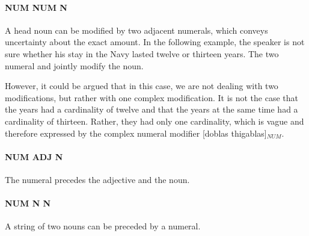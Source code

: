 \paragraph{NUM   NUM N}

A head noun can be modified by two adjacent numerals, which conveys uncertainty about the exact amount.
In the following example, the speaker is not sure whether his stay in the Navy lasted twelve or thirteen years. The two numeral  and  jointly modify the noun.


However, it could be argued that in this case, we are not dealing with two modifications, but rather with one complex modification. It is not the case that the years had a cardinality of twelve and that the years at the same time had a cardinality of thirteen. Rather, they had only one cardinality, which is vague and therefore expressed by the complex numeral modifier [doblas thigablas]$_{NUM}$.

\paragraph{NUM ADJ N}
The numeral precedes the adjective and the noun.


\paragraph{NUM N N}
A string of two nouns can be preceded by a numeral.

%

